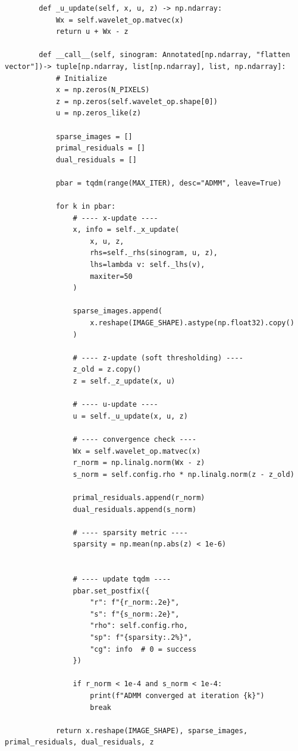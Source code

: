 \begin{verbatim}
        def _u_update(self, x, u, z) -> np.ndarray:
            Wx = self.wavelet_op.matvec(x)
            return u + Wx - z

        def __call__(self, sinogram: Annotated[np.ndarray, "flatten vector"])-> tuple[np.ndarray, list[np.ndarray], list, np.ndarray]:
            # Initialize
            x = np.zeros(N_PIXELS)
            z = np.zeros(self.wavelet_op.shape[0])
            u = np.zeros_like(z)

            sparse_images = []
            primal_residuals = []
            dual_residuals = []

            pbar = tqdm(range(MAX_ITER), desc="ADMM", leave=True)

            for k in pbar:
                # ---- x-update ----
                x, info = self._x_update(
                    x, u, z,
                    rhs=self._rhs(sinogram, u, z),
                    lhs=lambda v: self._lhs(v),
                    maxiter=50
                )

                sparse_images.append(
                    x.reshape(IMAGE_SHAPE).astype(np.float32).copy()
                )

                # ---- z-update (soft thresholding) ----
                z_old = z.copy()
                z = self._z_update(x, u)

                # ---- u-update ----
                u = self._u_update(x, u, z)

                # ---- convergence check ----
                Wx = self.wavelet_op.matvec(x)
                r_norm = np.linalg.norm(Wx - z)
                s_norm = self.config.rho * np.linalg.norm(z - z_old)

                primal_residuals.append(r_norm)
                dual_residuals.append(s_norm)

                # ---- sparsity metric ----
                sparsity = np.mean(np.abs(z) < 1e-6)


                # ---- update tqdm ----
                pbar.set_postfix({
                    "r": f"{r_norm:.2e}",
                    "s": f"{s_norm:.2e}",
                    "rho": self.config.rho,
                    "sp": f"{sparsity:.2%}",
                    "cg": info  # 0 = success
                })

                if r_norm < 1e-4 and s_norm < 1e-4:
                    print(f"ADMM converged at iteration {k}")
                    break

            return x.reshape(IMAGE_SHAPE), sparse_images, primal_residuals, dual_residuals, z


\end{verbatim}
